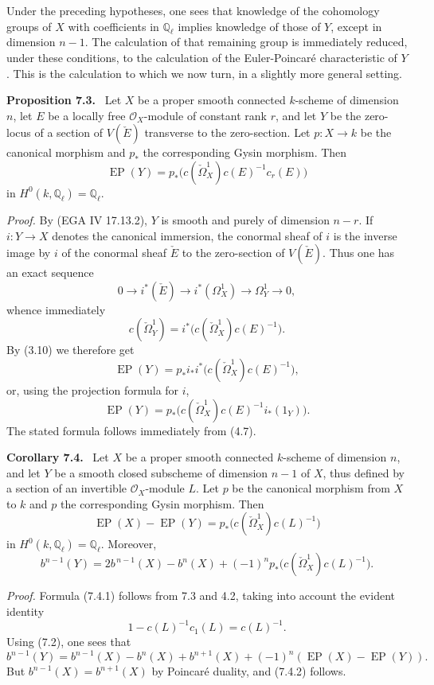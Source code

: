 \documentclass[11pt]{article}
\newenvironment{statement}[1]{\par\medskip\noindent\textbf{#1.}\ }{\par\medskip}
\begin{document}
Under the preceding hypotheses, one sees that knowledge of the cohomology groups of $X$ with coefficients in $\mathbb Q_\ell$ implies knowledge of those of $Y$, except in dimension $n-1$. The calculation of that remaining group is immediately reduced, under these conditions, to the calculation of the Euler-Poincaré characteristic of $Y$. This is the calculation to which we now turn, in a slightly more general setting.

\begin{statement}{Proposition 7.3}
Let $X$ be a proper smooth connected $k$-scheme of dimension $n$, let $E$ be a locally free $\mathcal O_X$-module of constant rank $r$, and let $Y$ be the zero-locus of a section of $V(\check E)$ transverse to the zero-section. Let $p:X\to k$ be the canonical morphism and $p_*$ the corresponding Gysin morphism. Then
\[
\operatorname{EP}(Y)=p_*\bigl(c(\check\Omega_X^1)c(E)^{-1}c_r(E)\bigr)
\]
in $H^0(k,\mathbb Q_\ell)=\mathbb Q_\ell$.
\end{statement}

\emph{Proof.} By (EGA IV 17.13.2), $Y$ is smooth and purely of dimension $n-r$. If $i:Y\to X$ denotes the canonical immersion, the conormal sheaf of $i$ is the inverse image by $i$ of the conormal sheaf $\check E$ to the zero-section of $V(\check E)$. Thus one has an exact sequence
\[
0\to i^*(\check E)\to i^*(\Omega_X^1)\to\Omega_Y^1\to0,
\tag{7.3.1}
\]
whence immediately
\[
c(\check\Omega_Y^1)=i^*\bigl(c(\check\Omega_X^1)c(E)^{-1}\bigr).
\tag{7.3.2}
\]
By (3.10) we therefore get
\[
\operatorname{EP}(Y)=p_*i_*i^*\bigl(c(\check\Omega_X^1)c(E)^{-1}\bigr),
\]
or, using the projection formula for $i$,
\[
\operatorname{EP}(Y)=p_*\bigl(c(\check\Omega_X^1)c(E)^{-1}i_*(1_Y)\bigr).
\]
The stated formula follows immediately from (4.7).

\begin{statement}{Corollary 7.4}
Let $X$ be a proper smooth connected $k$-scheme of dimension $n$, and let $Y$ be a smooth closed subscheme of dimension $n-1$ of $X$, thus defined by a section of an invertible $\mathcal O_X$-module $L$. Let $p$ be the canonical morphism from $X$ to $k$ and $p$ the corresponding Gysin morphism. Then
\[
\operatorname{EP}(X)-\operatorname{EP}(Y)=p_*\bigl(c(\check\Omega_X^1)c(L)^{-1}\bigr)
\tag{7.4.1}
\]
in $H^0(k,\mathbb Q_\ell)=\mathbb Q_\ell$. Moreover,
\[
b^{n-1}(Y)=2b^{\,n-1}(X)-b^n(X)+(-1)^n p_*\bigl(c(\check\Omega_X^1)c(L)^{-1}\bigr).
\tag{7.4.2}
\]
\end{statement}

\emph{Proof.} Formula (7.4.1) follows from 7.3 and 4.2, taking into account the evident identity
\[
1-c(L)^{-1}c_1(L)=c(L)^{-1}.
\]
Using (7.2), one sees that
\[
b^{n-1}(Y)=b^{n-1}(X)-b^n(X)+b^{n+1}(X)+(-1)^n(\operatorname{EP}(X)-\operatorname{EP}(Y)).
\]
But $b^{n-1}(X)=b^{n+1}(X)$ by Poincaré duality, and (7.4.2) follows.
\end{document}
